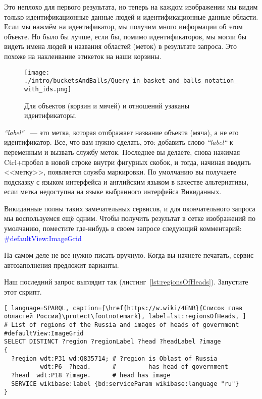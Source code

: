 Это неплохо для первого результата, но теперь на каждом изображении мы видим только идентификационные данные людей и идентификационные данные области. Если мы нажмём на идентификатор, мы получим много информации об этом объекте. Но было бы лучше, если бы, помимо идентификаторов, мы могли бы видеть имена людей и названия областей (меток) в результате запроса. Это похоже на наклеивание этикеток на наши корзины. 

\begin{figure*}[h!]
\texttt{[image: ./intro/bucketsAndBalls/Query\_in\_basket\_and\_balls\_notation\_with\_ids.png]}
\caption{Для объектов (корзин и мячей) и отношений узаканы идентификаторы.}
\label{fig:Query_in_basket_and_balls_notation_with_ids}
\end{figure*}

\textit{``label``} ~--- это метка, которая отображает название объекта (мяча), а не его идентификатор. Все, что вам нужно сделать, это: добавить слово \textit{``label``} к переменным и вызвать службу меток. Последнее вы делаете, снова нажимая Ctrl+пробел в новой строке внутри фигурных скобок, и тогда, начиная вводить <<метку>>, появляется служба маркировки. По умолчанию вы получаете подсказку с языком интерфейса и английским языком в качестве альтернативы, если метка недоступна на языке выбранного интерфейса Викиданных.

Викиданные полны таких замечательных сервисов, и для окончательного запроса мы воспользуемся ещё одним. Чтобы получить результат в сетке изображений по умолчанию, поместите где-нибудь в своем запросе следующий комментарий: \textcolor{blue}{\#defaultView:ImageGrid}

На самом деле не все нужно писать вручную. Когда вы начнете печатать, сервис автозаполнения предложит варианты.

\newpage
Наш последний запрос выглядит так (листинг~\ref{lst:regionsOfHeads}). Запустите этот скрипт.

\begin{lstlisting}[ language=SPARQL, caption={\href{https://w.wiki/4ENR}{Список глав областей России}\protect\footnotemark}, label=lst:regionsOfHeads, ]
# List of regions of the Russia and images of heads of government
#defaultView:ImageGrid
SELECT DISTINCT ?region ?regionLabel ?head ?headLabel ?image
{
  ?region wdt:P31 wd:Q835714; # ?region is Oblast of Russia
          wdt:P6  ?head.      #         has head of government
  ?head  wdt:P18 ?image.      # head has image
  SERVICE wikibase:label {bd:serviceParam wikibase:language "ru"} 
}
\end{lstlisting}


